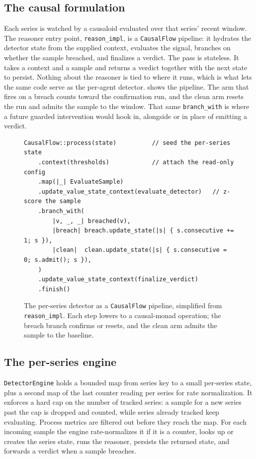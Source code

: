 \subsection{The causal formulation}
Each series is watched by a causaloid evaluated over that series' recent window.
The reasoner entry point, \texttt{reason\_impl}, is a \texttt{CausalFlow} pipeline:
it hydrates the detector state from the supplied context, evaluates the signal,
branches on whether the sample breached, and finalizes a verdict. The pass is
stateless. It takes a context and a sample and returns a verdict together with the
next state to persist. Nothing about the reasoner is tied to where it runs, which
is what lets the same code serve as the per-agent detector.
 shows the pipeline. The arm that fires on a breach counts
toward the confirmation run, and the clean arm resets the run and admits the sample
to the window. That same \texttt{branch\_with} is where a future guarded
intervention would hook in, alongside or in place of emitting a verdict.

\begin{figure}[t]
\begin{lstlisting}
CausalFlow::process(state)          // seed the per-series state
    .context(thresholds)            // attach the read-only config
    .map(|_| EvaluateSample)
    .update_value_state_context(evaluate_detector)   // z-score the sample
    .branch_with(
        |v, _, _| breached(v),
        |breach| breach.update_state(|s| { s.consecutive += 1; s }),
        |clean|  clean.update_state(|s| { s.consecutive = 0; s.admit(); s }),
    )
    .update_value_state_context(finalize_verdict)
    .finish()
\end{lstlisting}
  \caption{The per-series detector as a \dc{} \texttt{CausalFlow} pipeline,
  simplified from \texttt{reason\_impl}. Each step lowers to a causal-monad
  operation; the breach branch confirms or resets, and the clean arm admits the
  sample to the baseline.}
  \label{fig:causalflow}
\end{figure}

\subsection{The per-series engine}
\texttt{DetectorEngine} holds a bounded map from series key to a small per-series
state, plus a second map of the last counter reading per series for rate
normalization. It enforces a hard cap on the number of tracked series: a sample for
a new series past the cap is dropped and counted, while series already tracked keep
evaluating. Process metrics are filtered out before they reach the map. For each
incoming sample the engine rate-normalizes it if it is a counter, looks up or
creates the series state, runs the reasoner, persists the returned state, and
forwards a verdict when a sample breaches.

